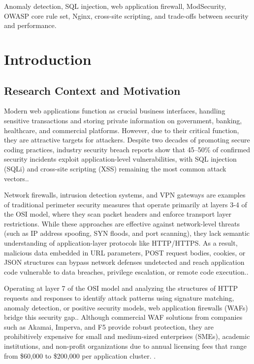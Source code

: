 \documentclass[10pt,conference]{IEEEtran}
\begin{document}
\begin{IEEEkeywords}
Anomaly detection, SQL injection, web application firewall, ModSecurity, OWASP core rule set, Nginx, cross-site scripting, and trade-offs between security and performance.
\end{IEEEkeywords}

\section{Introduction}

\subsection{Research Context and Motivation}

Modern web applications function as crucial business interfaces, handling sensitive transactions and storing private information on government, banking, healthcare, and commercial platforms. However, due to their critical function, they are attractive targets for attackers. Despite two decades of promoting secure coding practices, industry security breach reports show that 45–50\% of confirmed security incidents exploit application-level vulnerabilities, with SQL injection (SQLi) and cross-site scripting (XSS) remaining the most common attack vectors.\cite{verizon2024,wen2023}.

Network firewalls, intrusion detection systems, and VPN gateways are examples of traditional perimeter security measures that operate primarily at layers 3-4 of the OSI model, where they scan packet headers and enforce transport layer restrictions. While these approaches are effective against network-level threats (such as IP address spoofing, SYN floods, and port scanning), they lack semantic understanding of application-layer protocols like HTTP/HTTPS. As a result, malicious data embedded in URL parameters, POST request bodies, cookies, or JSON structures can bypass network defenses undetected and reach application code vulnerable to data breaches, privilege escalation, or remote code execution.\cite{welekar2024,alotaibi2023}.

Operating at layer 7 of the OSI model and analyzing the structures of HTTP requests and responses to identify attack patterns using signature matching, anomaly detection, or positive security models, web application firewalls (WAFs) bridge this security gap.\cite{manaseer2018,philip2023}. Although commercial WAF solutions from companies such as Akamai, Imperva, and F5 provide robust protection, they are prohibitively expensive for small and medium-sized enterprises (SMEs), academic institutions, and non-profit organizations due to annual licensing fees that range from \$60,000 to \$200,000 per application cluster. \cite{appsentinels2025,indusface2025}.
\end{document}
